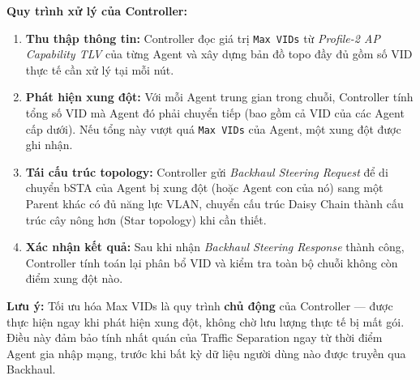 \textbf{Quy trình xử lý của Controller:}
\begin{enumerate}
	\item \textbf{Thu thập thông tin:} Controller đọc giá trị \texttt{Max VIDs} từ
	\textit{Profile-2 AP Capability TLV} của từng Agent và xây dựng bản đồ topo
	đầy đủ gồm số VID thực tế cần xử lý tại mỗi nút.
	\item \textbf{Phát hiện xung đột:} Với mỗi Agent trung gian trong chuỗi, Controller
	tính tổng số VID mà Agent đó phải chuyển tiếp (bao gồm cả VID của các Agent
	cấp dưới). Nếu tổng này vượt quá \texttt{Max VIDs} của Agent, một xung đột
	được ghi nhận.
	\item \textbf{Tái cấu trúc topology:} Controller gửi \textit{Backhaul Steering
		Request} để di chuyển bSTA của Agent bị xung đột (hoặc Agent con của nó) sang
	một Parent khác có đủ năng lực VLAN, chuyển cấu trúc Daisy Chain thành cấu
	trúc cây nông hơn (Star topology) khi cần thiết.
	\item \textbf{Xác nhận kết quả:} Sau khi nhận \textit{Backhaul Steering Response}
	thành công, Controller tính toán lại phân bổ VID và kiểm tra toàn bộ chuỗi
	không còn điểm xung đột nào.
\end{enumerate}

\textbf{Lưu ý:} Tối ưu hóa Max VIDs là quy trình \textbf{chủ động} của Controller ---
được thực hiện ngay khi phát hiện xung đột, không chờ lưu lượng thực tế bị mất gói.
Điều này đảm bảo tính nhất quán của Traffic Separation ngay từ thời điểm Agent gia
nhập mạng, trước khi bất kỳ dữ liệu người dùng nào được truyền qua Backhaul.
